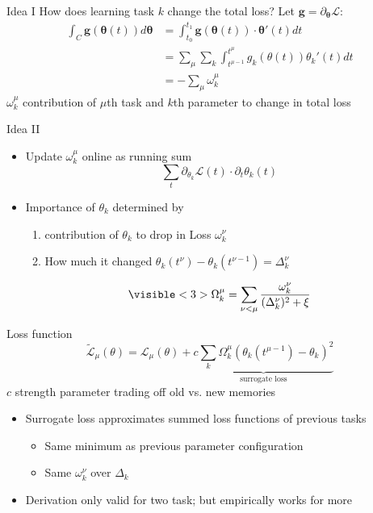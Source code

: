 \documentclass{beamer}
\begin{document}
\begin{frame}[fragile]{Idea I}
How does learning task $k$ change the total loss? Let $\bm g = \partial_{\bm \theta} \mathcal L$:
\begin{align}
\int_C \bm g(\bm \theta (t)) d \bm \theta& = \int_{t_0}^{t_1} \bm g(\bm \theta(t)) \cdot \bm \theta '(t) dt\\
& = \sum_\mu \sum_k \int_{t^{\mu-1}}^{t^\mu} g_k(\theta(t)) \theta_k'(t) dt \\
& = - \sum_\mu \omega_k^\mu
\end{align}
$\omega_k^\mu $ contribution of $\mu$th task and $k$th parameter to change in total loss

\end{frame}
\begin{frame}{Idea II}
	\begin{itemize}
		\item Update $\omega_k^\mu$ online as running sum $$\sum_{t}\partial_{\theta_k}\mathcal L(t) \cdot \partial_t \theta_k(t)$$
		\item<2-> Importance of $\theta_k$ determined by
		\begin{enumerate}
			\item <2->contribution of $\theta_k$ to drop in Loss $\omega_k^\nu$
			\item<2-> How much it changed $\theta_k(t^\nu) - \theta_k(t^{\nu -1}) = \Delta_k^\nu$
		\end{enumerate}
	\begin{equation}
	\visible<3>{\Omega_k^\mu = \sum_{\nu < \mu} \frac{\omega_k^\nu}{(\Delta_k^\nu)^2 + \xi}}
	\end{equation}
	\end{itemize}
\end{frame}

\begin{frame}{Loss function}
\begin{equation}
\tilde{\mathcal L}_\mu(\theta) = \mathcal L_\mu(\theta) + \underbrace{c \sum_k \Omega_k^\mu \left( \theta_k(t^{\mu-1}) - \theta_k\right)^2}_{\text{surrogate loss}}
\end{equation}
$c$ strength parameter trading off old vs. new memories
\begin{itemize}
	\item<2-> Surrogate loss approximates summed loss functions of previous tasks 
	\begin{itemize}
		\item<2-> Same minimum as previous parameter configuration
		\item<2-> Same $\omega_k^\nu$ over $\Delta_k$
	\end{itemize}
	\item<3-> Derivation only valid for two task; but empirically works for more
\end{itemize}
\end{frame}
\end{document}
